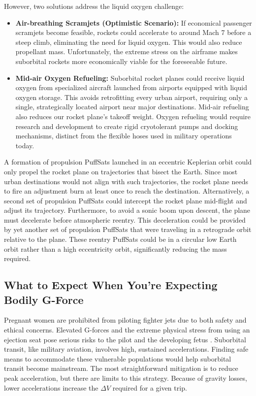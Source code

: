 \documentclass{article}
\begin{document}
{However, two solutions address the liquid oxygen challenge:
\begin{itemize}
\item \textbf{Air-breathing Scramjets (Optimistic Scenario):} If economical passenger scramjets become feasible, rockets could accelerate to around Mach 7 before a steep climb, eliminating the need for liquid oxygen. This would also reduce propellant mass. Unfortunately, the extreme stress on the airframe makes suborbital rockets more economically viable for the foreseeable future.
\item \textbf{Mid-air Oxygen Refueling:} Suborbital rocket planes could receive liquid oxygen from specialized aircraft launched from airports equipped with liquid oxygen storage. This avoids retrofitting every urban airport, requiring only a single, strategically located airport near major destinations.   Mid-air refueling also reduces our rocket plane's takeoff weight.  Oxygen refueling would require research and development to create rigid cryotolerant pumps and docking mechanisms, distinct from the flexible hoses used in military operations today.
\end{itemize}

A formation of propulsion PuffSats launched in an eccentric Keplerian orbit could only propel the  rocket plane on trajectories that bisect the Earth. Since most urban destinations would not align with such trajectories, the rocket plane needs to fire an adjustment burn at least once to reach the destination. Alternatively, a second set of propulsion PuffSats could intercept the rocket plane mid-flight and adjust its trajectory. Furthermore, to avoid a sonic boom upon descent, the plane must decelerate before atmospheric reentry. This deceleration could be provided by yet another set of propulsion PuffSats that were traveling in a retrograde orbit relative to the plane. These reentry PuffSats could be in a circular low Earth orbit rather than a high eccentricity orbit, significantly reducing the mass required.

\subsection{What to Expect When You're Expecting Bodily G-Force \cite{expecting_pregnancy_book}} \label{sec:pregnant_women}

Pregnant women are prohibited from piloting fighter jets due to both safety and ethical concerns. Elevated G-forces and the extreme physical stress from using an ejection seat pose serious risks to the pilot and the developing fetus \cite{pregnancy_gforce_risk}. Suborbital transit, like military aviation, involves high, sustained accelerations.  Finding safe means to accommodate these vulnerable populations would help suborbital transit become mainstream.  The most straightforward mitigation is to reduce peak acceleration, but there are limits to this strategy.  Because of gravity losses, lower accelerations increase the $\Delta V$ required for a given trip.  

}
\end{document}
